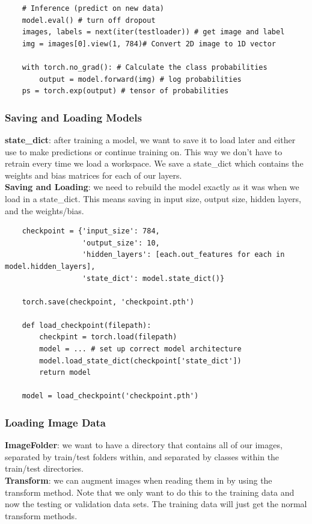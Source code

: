 \documentclass[11pt, a4paper]{article}
\begin{document}
\begin{spacing}{1.1}
\begin{lstlisting}
	# Inference (predict on new data)
	model.eval() # turn off dropout
	images, labels = next(iter(testloader)) # get image and label
	img = images[0].view(1, 784)# Convert 2D image to 1D vector
	
	with torch.no_grad(): # Calculate the class probabilities
		output = model.forward(img) # log probabilities
	ps = torch.exp(output) # tensor of probabilities	      
	\end{lstlisting} \vspace*{2mm}
	
	\subsubsection{Saving and Loading Models}
	\textbf{state\_dict}: after training a model, we want to save it to load later and either use to make predictions or continue training on. This way we don't have to retrain every time we load a workspace. We save a state\_dict which contains the weights and bias matrices for each of our layers. \vspace*{2mm}\\
	\textbf{Saving and Loading}: we need to rebuild the model exactly as it was when we load in a state\_dict. This means saving in input size, output size, hidden layers, and the weights/bias. 
	\begin{lstlisting}
	checkpoint = {'input_size': 784,
	              'output_size': 10,
	              'hidden_layers': [each.out_features for each in model.hidden_layers],
	              'state_dict': model.state_dict()}
	
	torch.save(checkpoint, 'checkpoint.pth')
	
	def load_checkpoint(filepath):
		checkpint = torch.load(filepath)
		model = ... # set up correct model architecture
		model.load_state_dict(checkpoint['state_dict'])
		return model
		
	model = load_checkpoint('checkpoint.pth')	
	\end{lstlisting} \vspace*{2mm}
	
	\subsubsection{Loading Image Data}
	\textbf{ImageFolder}: we want to have a directory that contains all of our images, separated by train/test folders within, and separated by classes within the train/test directories. \vspace*{2mm}\\
	\textbf{Transform}: we can augment images when reading them in by using the transform method. Note that we only want to do this to the training data and now the testing or validation data sets. The training data will just get the normal transform methods. \newpage


\end{spacing}
\end{document}
